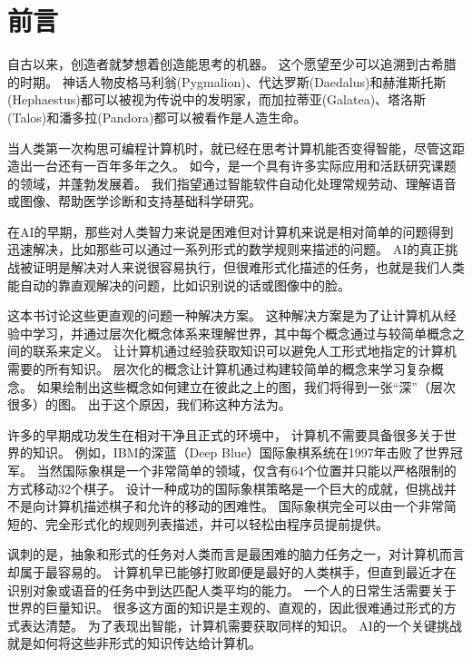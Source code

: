 \chapter{前言}
\label{chap:introduction}
自古以来，创造者就梦想着创造能思考的机器。
这个愿望至少可以追溯到古希腊的时期。
神话人物皮格马利翁(Pygmalion)、代达罗斯(Daedalus)和赫淮斯托斯(Hephaestus)都可以被视为传说中的发明家，而加拉蒂亚(Galatea)、塔洛斯(Talos)和潘多拉(Pandora)都可以被看作是人造生命\citep{ovid2004metamorphoses,sparkes1996red,1997works}。

当人类第一次构思可编程计算机时，就已经在思考计算机能否变得智能，尽管这距造出一台还有一百年多年之久\citep{Lovelace1842}。
如今，是一个具有许多实际应用和活跃研究课题的领域，并蓬勃发展着。
我们指望通过智能软件自动化处理常规劳动、理解语音或图像、帮助医学诊断和支持基础科学研究。

在\gls{AI}的早期，那些对人类智力来说是困难但对计算机来说是相对简单的问题得到迅速解决，比如那些可以通过一系列形式的数学规则来描述的问题。
\gls{AI}的真正挑战被证明是解决对人来说很容易执行，但很难形式化描述的任务，也就是我们人类能自动的靠直观解决的问题，比如识别说的话或图像中的脸。

这本书讨论这些更直观的问题一种解决方案。
这种解决方案是为了让计算机从经验中学习，并通过层次化概念体系来理解世界，其中每个概念通过与较简单概念之间的联系来定义。
让计算机通过经验获取知识可以避免人工形式地指定的计算机需要的所有知识。
层次化的概念让计算机通过构建较简单的概念来学习复杂概念。
如果绘制出这些概念如何建立在彼此之上的图，我们将得到一张``深''（层次很多）的图。
出于这个原因，我们称这种方法为。


许多的早期成功发生在相对干净且正式的环境中， 计算机不需要具备很多关于世界的知识。
例如，IBM的深蓝（Deep Blue）国际象棋系统在1997年击败了世界冠军\citep{Hsu2002}。
当然国际象棋是一个非常简单的领域，仅含有64个位置并只能以严格限制的方式移动32个棋子。
设计一种成功的国际象棋策略是一个巨大的成就，但挑战并不是向计算机描述棋子和允许的移动的困难性。
国际象棋完全可以由一个非常简短的、完全形式化的规则列表描述，并可以轻松由程序员提前提供。

讽刺的是，抽象和形式的任务对人类而言是最困难的脑力任务之一，对计算机而言却属于最容易的。
计算机早已能够打败即便是最好的人类棋手，但直到最近才在识别对象或语音的任务中到达匹配人类平均的能力。
一个人的日常生活需要关于世界的巨量知识。
很多这方面的知识是主观的、直观的，因此很难通过形式的方式表达清楚。
为了表现出智能，计算机需要获取同样的知识。
\gls{AI}的一个关键挑战就是如何将这些非形式的知识传达给计算机。

